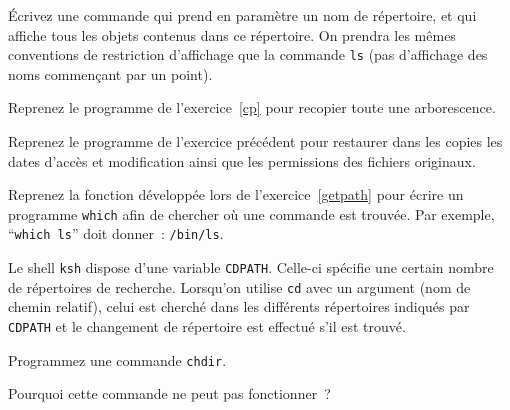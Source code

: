 \question

Écrivez une commande qui prend en paramètre un nom de répertoire, et
qui affiche tous les objets contenus dans ce répertoire. On prendra les
mêmes conventions de restriction d'affichage que la commande {\tt ls}
(pas d'affichage des noms commençant par un point).


\question

Reprenez le programme de l'exercice~\ref {cp} pour recopier toute une
arborescence.


\question

Reprenez le programme de l'exercice précédent pour restaurer dans les
copies les dates d'accès et modification ainsi que les permissions des
fichiers originaux.


\question

Reprenez la fonction développée lors de l'exercice~\ref {getpath} pour écrire
un programme {\tt which} afin de chercher où une commande est trouvée.
Par exemple, ``{\tt which~ls}'' doit donner~: {\tt /bin/ls}.


\question

Le shell {\tt ksh} dispose d'une variable {\tt CDPATH}.  Celle-ci
spécifie une certain nombre de répertoires de recherche.  Lorsqu'on
utilise {\tt cd} avec un argument (nom de chemin relatif), celui est
cherché dans les différents répertoires indiqués par {\tt CDPATH} et le
changement de répertoire est effectué s'il est trouvé.

Programmez une commande {\tt chdir}.

Pourquoi cette commande ne peut pas fonctionner~?


